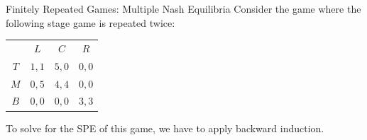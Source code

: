 \documentclass[8pt]{extarticle}
\begin{document}
  \begin{problem}{Finitely Repeated Games: Multiple Nash Equilibria}
    Consider the game where the following stage game is repeated twice:
    \begin{center}
      \renewcommand{\arraystretch}{1.5}
      \begin{tabular}{c|c|c|c|}
        \multicolumn{1}{c}{} & \multicolumn{1}{c}{$L$}& \multicolumn{1}{c}{$C$}& \multicolumn{1}{c}{$R$}\\
        \cline{2-4}
        $T$ & $1,1$ & $5,0$ & $0,0$\\
        \cline{2-4}
        $M$ & $0,5$ & $4,4$ & $0,0$\\
        \cline{2-4}
        $B$ & $0,0$ & $0,0$ & $3,3$\\
        \cline{2-4}
      \end{tabular}
    \end{center}
    To solve for the SPE of this game, we have to apply backward induction.\\


\end{problem}
\end{document}

